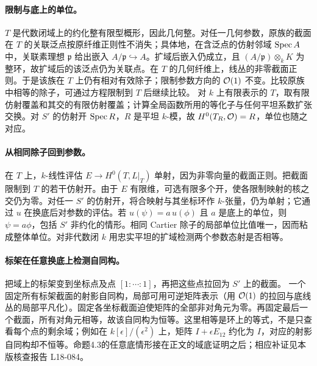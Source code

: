 \paragraph{限制与底上的单位。}
\(T\) 是代数闭域上的约化整有限型概形，因此几何整。对任一几何参数，原族的截面在 \(T\) 的关联泛点按原纤维正则性不消失；具体地，在含泛点的仿射邻域 \(\Spec A\) 中，关联素理想 \(\mathfrak p\) 给出嵌入 \(A/\mathfrak p\hookrightarrow A\)。扩域后嵌入仍成立，且 \((A/\mathfrak p)\otimes_k K\) 为整环，故扩域后的该泛点仍为关联点。在 \(T\) 的几何纤维上，线丛的非零截面正则。于是该族在 \(T\) 上仍有相对有效除子；限制参数方向的 \(\OO(1)\) 不变。比较原族中相等的除子，可通过方程限制到 \(T\) 后继续比较。
对 \(k\) 上有限表示的 \(T\)，取有限仿射覆盖和其交的有限仿射覆盖；计算全局函数所用的等化子与任何平坦系数扩张交换。对 \(S'\) 的仿射开 \(\Spec R\)，\(R\) 是平坦 \(k\)-模，故 \(H^0(T_R,\OO)=R\)，单位也随之对应。

\paragraph{从相同除子回到参数。}
在 \(T\) 上，\(k\)-线性评估 \(E\to H^0(T,L|_T)\) 单射，因为非零向量的截面正则。把截面限制到 \(T\) 的若干仿射开。由于 \(E\) 有限维，可选有限多个开，使各限制映射的核之交仍为零。对任一 \(S'\) 的仿射开，将合映射与其坐标环作 \(k\)-张量，仍为单射；它通过 \(u\) 在换底后对参数的评估。若 \(u(\psi)=a\,u(\phi)\) 且 \(a\) 是底上的单位，则 \(\psi=a\phi\)，包括 \(S'\) 非约化的情形。相同 Cartier 除子的局部单位比值唯一，因而粘成整体单位。对非代数闭 \(k\) 用忠实平坦的扩域检测两个参数态射是否相等。

\paragraph{标架在任意换底上检测自同构。}
把域上的标架变到坐标点及点 \([1:\cdots:1]\)，再把这些点拉回为 \(S'\) 上的截面。
一个固定所有标架截面的射影自同构，局部可用可逆矩阵表示（用 \(\OO(1)\) 的拉回与底线丛的局部平凡化）。固定各坐标截面迫使矩阵的全部非对角元为零。再固定最后一个截面，所有对角元相等，故该自同构为恒等。这里相等是环上的等式，不是只查看每个点的剩余域；例如在 \(k[\epsilon]/(\epsilon^2)\) 上，矩阵 \(I+\epsilon E_{12}\) 约化为 \(I\)，对应的射影自同构却不恒等。命题4.3的任意底情形接在正文的域底证明之后；相应补证见本版核查报告 L18-084。
\par\endgroup

\begingroup
\def\Spec{\operatorname{Spec}}
\def\Aut{\operatorname{Aut}}
\def\Div{\operatorname{Div}}
\def\OO{\mathcal O}
\def\PP{\mathbf P}
\def\m{\mathfrak m}
\def\Hom{\operatorname{Hom}}
\hypertarget{audit:L18-084}{}
